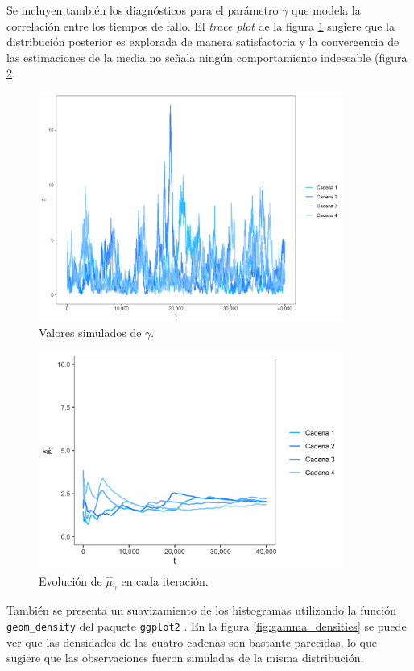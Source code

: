 \documentclass[11pt,a4paper]{article}
\begin{document}
Se incluyen también los diagnósticos para el parámetro $\gamma$ que modela la correlación entre los tiempos de fallo. El \textit{trace plot} de la figura \ref{fig:gamma_trace} sugiere que la distribución posterior es explorada de manera satisfactoria y la convergencia de las estimaciones de la media no señala ningún comportamiento indeseable (figura \ref{fig:gamma_means}.\\

\begin{figure}[!p]
\centering\includegraphics[width=10cm]{gamma_traceplot.png}
\caption{Valores simulados de $\gamma$.}
\label{fig:gamma_trace}
\end{figure}

\begin{figure}[!p]
\centering\includegraphics[width=10cm]{gamma_ergodic_means.png}
\caption{Evolución de $\hat{\mu}_{\gamma}$ en cada iteración.}
\label{fig:gamma_means}
\end{figure}

También se presenta un suavizamiento de los histogramas utilizando la función \texttt{geom\_density} del paquete \texttt{ggplot2} \citep{ggplot}. En la figura \ref{fig:gamma_densities} se puede ver que las densidades de las cuatro cadenas son bastante parecidas, lo que sugiere que las observaciones fueron simuladas de la misma distribución.\\
\end{document}
